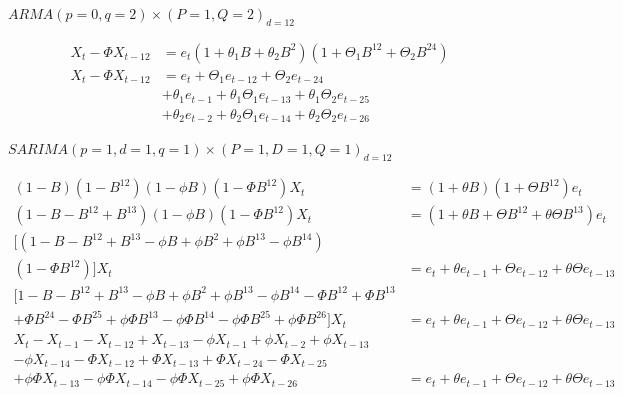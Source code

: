 \documentclass[10pt,a4paper]{exam}
\begin{document}
\begin{questions}
\begin{parts}
\item $ARMA(p = 0, q = 2) \times (P = 1, Q = 2)_{d=12}$
\begin{solution}
\begin{align*}
X_t - \Phi X_{t-12}   &= e_t(1 + \theta_1 B + \theta_2 B^2)(1 + \Theta_1 B^{12} + \Theta_2 B^{24})\\
X_t - \Phi X_{t-12}   	&=	e_t + \Theta_1 e_{t-12} + \Theta_2 e_{t-24}\\
								&+	\theta_1 e_{t-1} + \theta_1\Theta_1 e_{t-13} + \theta_1 \Theta_2 e_{t-25}\\
								&+	\theta_2 e_{t-2} + \theta_2\Theta_1e_{t-14} + \theta_2\Theta_2e_{t-26}
\end{align*}
\end{solution}

\item $SARIMA(p = 1, d = 1, q = 1) \times (P = 1, D = 1, Q = 1)_{d=12}$
\begin{solution}
\begin{align*}
(1-B)(1-B^{12})(1 - \phi B)(1 - \Phi B^{12})X_t 			&= (1 + \theta B)(1 + \Theta B^{12})e_t\\
(1 - B - B^{12} + B^{13})(1 - \phi B)(1 - \Phi B^{12})X_t 	&= (1 + \theta B + \Theta B^{12} + \theta \Theta B^{13})e_t\\
\Big[(1 - B - B^{12} + B^{13} - \phi B + \phi B^2 + \phi B^{13} - \phi B^{14})		&\\
(1-\Phi B^{12})\Big]X_t				&= e_t + \theta e_{t-1} + \Theta e_{t-12} + \theta \Theta e_{t-13}\\
\Big[1 - B - B^{12} + B^{13} - \phi B + \phi B^2 + \phi B^{13} - \phi B^{14}	-\Phi B^{12} + \Phi B^{13}&\\
 + \Phi B^{24} - \Phi B^{25} + \phi\Phi B^{13} - \phi\Phi B^{14} - \phi\Phi B^{25} + \phi\Phi B^{26} \Big] X_t &=e_t + \theta e_{t-1} + \Theta e_{t-12} + \theta \Theta e_{t-13}\\
 X_t - X_{t-1} - X_{t-12} + X_{t-13} - \phi X_{t-1} + \phi X_{t-2} + \phi X_{t-13} &\\
 - \phi X_{t-14} - \Phi X_{t-12} + \Phi X_{t-13} + \Phi X_{t-24} - \Phi X_{t-25} 	&\\
 +  \phi\Phi X_{t-13} - \phi \Phi X_{t-14} - \phi \Phi X_{t-25} + \phi \Phi X_{t-26}	&= e_t + \theta e_{t-1} + \Theta e_{t-12} + \theta \Theta e_{t-13}\\
\end{align*}
\end{solution}

\end{parts}
\end{questions}
\end{document}

